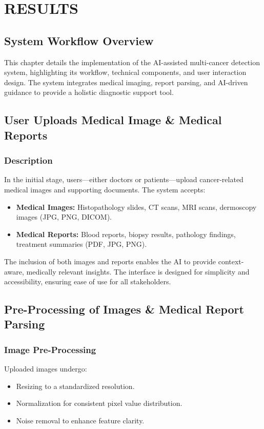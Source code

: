 \documentclass[a4paper,12pt]{report}
\begin{document}
\chapter{RESULTS}
\label{ch:implementation}
\begin{doublespace}
\section{System Workflow Overview}
This chapter details the implementation of the AI-assisted multi-cancer detection system, highlighting its workflow, technical components, and user interaction design. The system integrates medical imaging, report parsing, and AI-driven guidance to provide a holistic diagnostic support tool.


\section{User Uploads Medical Image \& Medical Reports}
\subsection*{Description}
In the initial stage, users—either doctors or patients—upload cancer-related medical images and supporting documents. The system accepts:
\begin{itemize}
    \item \textbf{Medical Images:} Histopathology slides, CT scans, MRI scans, dermoscopy images (JPG, PNG, DICOM).
    \item \textbf{Medical Reports:} Blood reports, biopsy results, pathology findings, treatment summaries (PDF, JPG, PNG).
\end{itemize}
The inclusion of both images and reports enables the AI to provide context-aware, medically relevant insights. The interface is designed for simplicity and accessibility, ensuring ease of use for all stakeholders.

\section{Pre-Processing of Images \& Medical Report Parsing}
\subsection*{Image Pre-Processing}
Uploaded images undergo:
\begin{itemize}
    \item Resizing to a standardized resolution.
    \item Normalization for consistent pixel value distribution.
    \item Noise removal to enhance feature clarity.
\end{itemize}


\end{doublespace}
\end{document}

